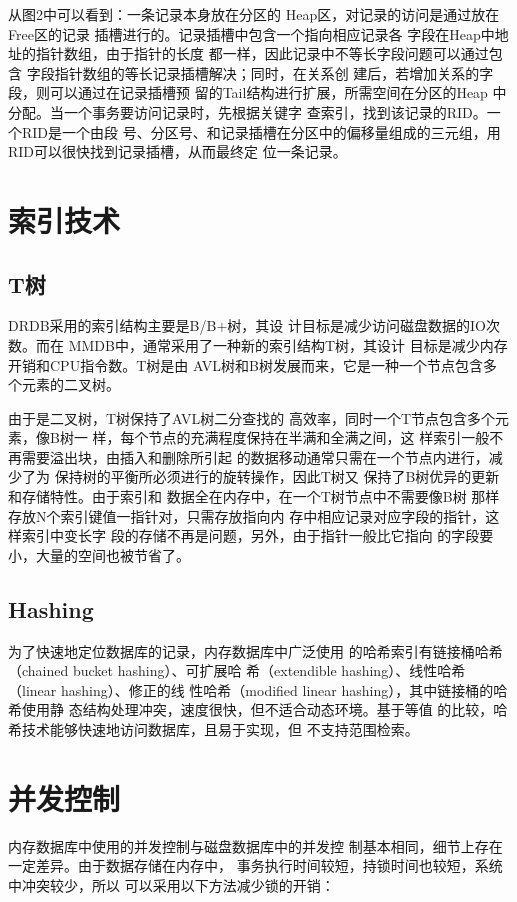 \documentclass[literaturereview]{zjutreport}
\begin{document}

从图2中可以看到：一条记录本身放在分区的
Heap区，对记录的访问是通过放在Free区的记录
插槽进行的。记录插槽中包含一个指向相应记录各
字段在Heap中地址的指针数组，由于指针的长度
都一样，因此记录中不等长字段问题可以通过包含
字段指针数组的等长记录插槽解决；同时，在关系创
建后，若增加关系的字段，则可以通过在记录插槽预
留的Tail结构进行扩展，所需空间在分区的Heap
中分配。当一个事务要访问记录时，先根据关键字
查索引，找到该记录的RID。一个RID是一个由段
号、分区号、和记录插槽在分区中的偏移量组成的三元组，用RID可以很快找到记录插槽，从而最终定
位一条记录。

\section{索引技术}
\subsection{T树}
DRDB采用的索引结构主要是B/B$+$树，其设
计目标是减少访问磁盘数据的IO次数。而在
MMDB中，通常采用了一种新的索引结构T树，其设计
目标是减少内存开销和CPU指令数。T树是由
AVL树和B树发展而来，它是一种一个节点包含多
个元素的二叉树。


由于是二叉树，T树保持了AVL树二分查找的
高效率，同时一个T节点包含多个元素，像B树一
样，每个节点的充满程度保持在半满和全满之间，这
样索引一般不再需要溢出块，由插入和删除所引起
的数据移动通常只需在一个节点内进行，减少了为
保持树的平衡所必须进行的旋转操作，因此T树又
保持了B树优异的更新和存储特性。由于索引和
数据全在内存中，在一个T树节点中不需要像B树
那样存放N个索引键值一指针对，只需存放指向内
存中相应记录对应字段的指针，这样索引中变长字
段的存储不再是问题，另外，由于指针一般比它指向
的字段要小，大量的空间也被节省了。

\subsection{Hashing}
为了快速地定位数据库的记录，内存数据库中广泛使用
的哈希索引有链接桶哈希（chained bucket hashing）、可扩展哈
希（extendible hashing）、线性哈希（linear hashing）、修正的线
性哈希（modified linear hashing），其中链接桶的哈希使用静
态结构处理冲突，速度很快，但不适合动态环境。基于等值
的比较，哈希技术能够快速地访问数据库，且易于实现，但
不支持范围检索。

\section{并发控制}
内存数据库中使用的并发控制与磁盘数据库中的并发控
制基本相同，细节上存在一定差异。由于数据存储在内存中，
事务执行时间较短，持锁时间也较短，系统中冲突较少，所以
可以采用以下方法减少锁的开销：
\end{document}
